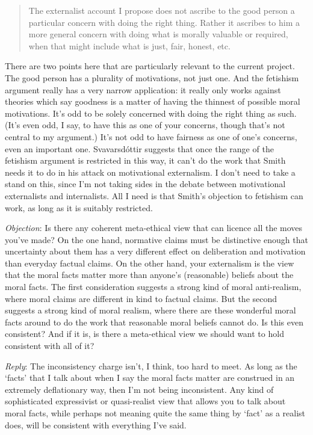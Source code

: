\begin{quote}

The externalist account I propose does not ascribe to the good person a particular concern with doing the right thing. Rather it ascribes to him a more general concern with doing what is morally valuable or required, when that might include what is just, fair, honest, etc. ~\citep[197--8]{Svavarsdottir1999}
\end{quote}
There are two points here that are particularly relevant to the current project. The good person has a plurality of motivations, not just one. And the fetishism argument really has a very narrow application: it really only works against theories which say goodness is a matter of having the thinnest of possible moral motivations. It's odd to be solely concerned with doing the right thing as such. (It's even odd, I say, to have this as one of your concerns, though that's not central to my argument.) It's not odd to have fairness as one of one's concerns, even an important one. Svavarsdóttir suggests that once the range of the fetishism argument is restricted in this way, it can't do the work that Smith needs it to do in his attack on motivational externalism. I don't need to take a stand on this, since I'm not taking sides in the debate between motivational externalists and internalists. All I need is that Smith's objection to fetishism can work, as long as it is suitably restricted.

\emph{Objection}: Is there any coherent meta-ethical view that can licence all the moves you've made? On the one hand, normative claims must be distinctive enough that uncertainty about them has a very different effect on deliberation and motivation than everyday factual claims. On the other hand, your externalism is the view that the moral facts matter more than anyone's (reasonable) beliefs about the moral facts. The first consideration suggests a strong kind of moral anti-realism, where moral claims are different in kind to factual claims. But the second suggests a strong kind of moral realism, where there are these wonderful moral facts around to do the work that reasonable moral beliefs cannot do. Is this even consistent? And if it is, is there a meta-ethical view we should want to hold consistent with all of it?

\emph{Reply}: The inconsistency charge isn't, I think, too hard to meet. As long as the `facts' that I talk about when I say the moral facts matter are construed in an extremely deflationary way, then I'm not being inconsistent. Any kind of sophisticated expressivist or quasi-realist view that allows you to talk about moral facts, while perhaps not meaning quite the same thing by `fact' as a realist does, will be consistent with everything I've said.

